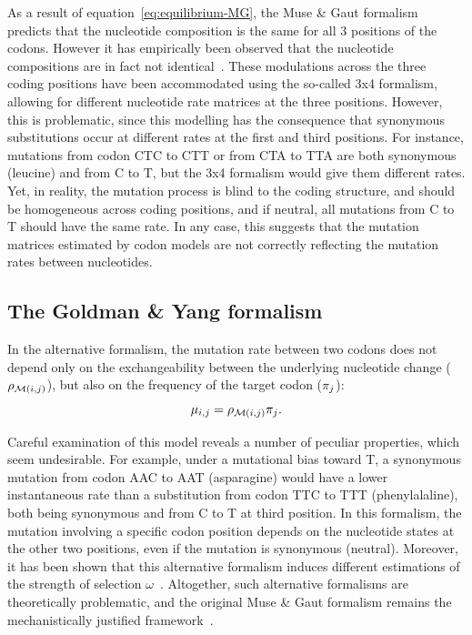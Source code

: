 As a result of equation~\ref{eq:equilibrium-MG}, the Muse \& Gaut formalism predicts that the nucleotide composition is the same for all $3$ positions of the codons.
However it has empirically been observed that the nucleotide compositions are in fact not identical~\citep{Singer2000}.
These modulations across the three coding positions have been accommodated using the so-called 3x4 formalism, allowing for different nucleotide rate matrices at the three positions.
However, this is problematic, since this modelling has the consequence that synonymous substitutions occur at different rates at the first and third positions.
For instance, mutations from codon CTC to CTT or from CTA to TTA are both synonymous (leucine) and from C to T, but the 3x4 formalism would give them different rates.
Yet, in reality, the mutation process is blind to the coding structure, and should be homogeneous across coding positions, and if neutral, all mutations from C to T should have the same rate.
In any case, this suggests that the mutation matrices estimated by codon models are not correctly reflecting the mutation rates between nucleotides.

\subsection{The Goldman \& Yang formalism}
\label{subsec:GY-formalism}

In the alternative \citet{Goldman1994} formalism, the mutation rate between two codons does not depend only on the exchangeability between the underlying nucleotide change ($\rho_{\mathcal{M}({i}, {j})}$), but also on the frequency of the target codon ($\pi_{{j}}$):
\begin{equation}
    \mu_{{i}, {j}} = \rho_{\mathcal{M}({i}, {j})} \pi_{{j}}.
\end{equation}

Careful examination of this model reveals a number of peculiar properties, which seem undesirable.
For example, under a mutational bias toward T, a synonymous mutation from codon AAC to AAT (asparagine) would have a lower instantaneous rate than a substitution from codon TTC to TTT (phenylalaline), both being synonymous and from C to T at third position.
In this formalism, the mutation involving a specific codon position depends on the nucleotide states at the other two positions, even if the mutation is synonymous (neutral).
Moreover, it has been shown that this alternative formalism induces different estimations of the strength of selection $\omega$~\citep{Pond2005a,Yap2010, Spielman2015}.
Altogether, such alternative formalisms are theoretically problematic, and the original Muse \& Gaut formalism remains the mechanistically justified framework~\citep{Rodrigue2008a}.

